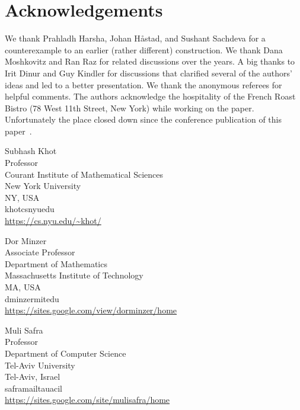 \documentclass{toc}
\begin{document}
\section{Acknowledgements}   %
We thank  Prahladh Harsha,  Johan H{\aa}stad, and Sushant Sachdeva  for a counterexample
to an earlier (rather different) construction. We thank
Dana Moshkovitz and Ran Raz for related discussions over the years.  A big thanks to
Irit Dinur and Guy Kindler for discussions that clarified several of
the  %
authors' ideas and led to a better presentation.
We thank
the  %
anonymous referees for helpful comments.
%
%
%
%
%
%
The authors acknowledge the hospitality of the French Roast Bistro
(78 West 11th Street, New York) while working on the paper.
Unfortunately the place closed down since the conference publication of 
this paper~\cite{conf-version}.  %


%
%
%
%



%
%
%
%
%
\begin{tocauthors}
\begin{tocinfo}[khot]
 Subhash Khot\\
 Professor\\
 Courant Institute of Mathematical Sciences\\
 New York University\\
 NY, USA\\
 khot\tocat{}cs\tocdot{}nyu\tocdot{}edu \\   %
 \url{https://cs.nyu.edu/~khot/}      %
\end{tocinfo}
\begin{tocinfo}[minzer]
  Dor Minzer\\
  Associate Professor\\
  Department of Mathematics\\
  Massachusetts Institute of Technology\\
  MA, USA\\
  dminzer\tocat{}mit\tocdot{}edu \\
  \url{https://sites.google.com/view/dorminzer/home}
\end{tocinfo}
\begin{tocinfo}[safra]
  Muli Safra\\
  Professor\\
  Department of Computer Science\\
  Tel-Aviv University\\
  Tel-Aviv, Israel\\
  safra\tocat{}mail\tocdot{}tau\tocdot{}ac\tocdot{}il\\
  \url{https://sites.google.com/site/mulisafra/home}
\end{tocinfo}
\end{tocauthors}
\end{document}
